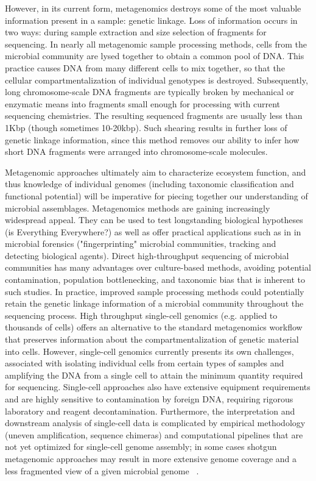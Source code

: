 \documentclass[10pt]{article}
\begin{document}
However, in its current form, metagenomics destroys some of the most valuable information present in a sample: genetic linkage. 
Loss of information occurs in two ways: during sample extraction and size selection of fragments for sequencing.
In nearly all metagenomic sample processing methods, cells from the microbial community are lysed together to obtain a common pool of DNA.
This practice causes DNA from many different cells to mix together, so that the cellular compartmentalization of individual genotypes is destroyed.
Subsequently, long chromosome-scale DNA fragments are typically broken by mechanical or enzymatic means into fragments small enough for processing with current sequencing chemistries. 
The resulting sequenced fragments are usually less than 1Kbp (though sometimes 10-20kbp). 
Such shearing results in further loss of  genetic linkage information, since this method removes our ability to infer how short DNA fragments were arranged into chromosome-scale molecules.

Metagenomic approaches ultimately aim to characterize ecosystem function, and thus knowledge of individual genomes (including taxonomic classification and functional potential) will be imperative for piecing together our understanding of microbial assemblages.
Metagenomics methods are gaining increasingly widespread appeal.
They can be used to test longstanding biological hypotheses (is Everything Everywhere?) as well as offer practical applications such as in in microbial forensics ("fingerprinting" microbial communities, tracking and detecting biological agents).
Direct high-throughput sequencing of microbial communities has many advantages over culture-based methods, avoiding potential contamination, population bottlenecking, and taxonomic bias that is inherent to such studies.
In practice, improved sample processing methods could potentially retain the genetic linkage information of a microbial community throughout the sequencing process.
High throughput single-cell genomics (e.g. applied to thousands of cells) offers an alternative to the standard metagenomics workflow that preserves information about the compartmentalization of genetic material into cells. 
However, single-cell genomics currently presents its own challenges, associated with isolating individual cells from certain types of samples and amplifying the {DNA} from a single cell to attain the minimum quantity required for sequencing. 
Single-cell approaches also have extensive equipment requirements and are highly sensitive to contamination by foreign DNA, requiring rigorous laboratory and reagent decontamination. 
Furthermore, the interpretation and downstream analysis of single-cell data is complicated by empirical methodology (uneven amplification, sequence chimeras) and computational pipelines that are not yet optimized for single-cell genome assembly; in some cases shotgun metagenomic approaches may result in more extensive genome coverage and a less fragmented view of a given microbial genome ~\cite{Stepanauskas2012}. 
\end{document}
